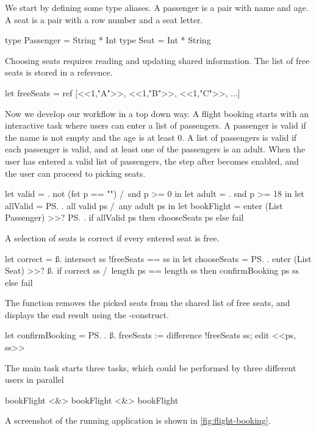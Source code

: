 \begin{example}
\label{exm:flight-booking}

We start by defining some type aliases.
A passenger is a pair with name and age.
A seat is a pair with a row number and a seat letter.
\begin{TASK}
  type Passenger = String * Int
  type Seat = Int * String
\end{TASK}

Choosing seats requires reading and updating shared information.
The list of free seats is stored in a reference. %
\begin{TASK}
  let freeSeats = ref [<<1,"A">>, <<1,"B">>, <<1,"C">>, ...]
\end{TASK}

Now we develop our workflow in a top down way.
A flight booking starts with an interactive task 
where users can enter a list of passengers.
A passenger is valid if the name is not empty and the age is at least 0.
A list of passengers is valid if each passenger is valid, and at least one of the passengers is an adult.
When the user has entered a valid list of passengers, the step after  becomes enabled,
and the user can proceed to picking seats.
\begin{TASK}
  let valid = \p. not (fst p == "") /\ snd p >= 0 in
  let adult = \p. snd p >= 18 in
  let allValid = \ps. all valid ps /\ any adult ps in
  let bookFlight = enter (List Passenger) >>? \ps.
    if allValid ps then chooseSeats ps else fail
\end{TASK}
A selection of seats is correct if every entered seat is free.
\begin{TASK}
  let correct = \ss. intersect ss !freeSeats == ss in
  let chooseSeats = \ps. enter (List Seat) >>? \ss.
    if correct ss /\ length ps == length ss then confirmBooking ps ss else fail
\end{TASK}
The function  removes the picked seats from the shared list of free seats,
and displays the end result using the -construct.
\begin{TASK}
  let confirmBooking = \ps. \ss.
    freeSeats := difference !freeSeats ss; edit <<ps, ss>>
\end{TASK}

The main task starts three  tasks,
which could be performed by three different users in parallel
\begin{TASK}
  bookFlight <&> bookFlight <&> bookFlight
\end{TASK}
A screenshot of the running application is shown in \cref{fig:flight-booking}.


\end{example}

